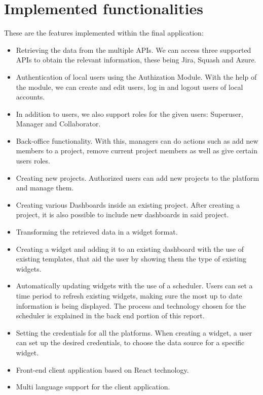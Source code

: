 \documentclass[a4paper,twoside,10pt]{report}
\begin{document}
\section{Implemented functionalities}
These are the features implemented within the final application:
 
\begin{itemize}
     \item Retrieving the data from the multiple APIs. We can access three supported APIs to obtain the relevant information, these being Jira, Squash and Azure.
    
     \item Authentication of local users using the Authization Module. With the help of the module, we can create and edit users, log in and logout users of local accounts.
    
     \item In addition to users, we also support roles for the given users: Superuser, Manager and Collaborator.
    
     \item Back-office functionality. With this, managers can do actions such as add new members to a project, remove current project members as well as give certain users roles.

     \item Creating new projects. Authorized users can add new projects to the platform and manage them.

     \item Creating various Dashboards inside an existing project. After creating a project, it is also possible to include new dashboards in said project.

     \item Transforming the retrieved data in a widget format.

     \item Creating a widget and adding it to an existing dashboard with the use of existing templates, that aid the user by showing them the type of existing widgets.

     \item Automatically updating widgets with the use of a scheduler. Users can set a time period to refresh existing widgets, making sure the most up to date information is being displayed. The process and technology chosen for the scheduler is explained in the back end portion of this report.

     \item Setting the credentials for all the platforms. When creating a widget, a user can set up the desired credentials, to choose the data source for a specific widget.

     \item Front-end client application based on React technology.

     \item Multi language support for the client application.

\end{itemize}
\end{document}
